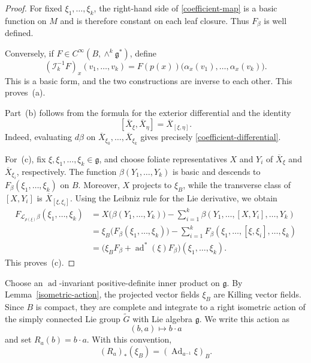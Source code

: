 \documentclass[reqno, 11pt]{amsart}
\theoremstyle{definition}
\theoremstyle{property}
\theoremstyle{remark}
\numberwithin{equation}{section}
\begin{document}
\begin{proof}
For fixed $\xi_1,\dots,\xi_k$, the right-hand side of
\eqref{coefficient-map} is a basic function on $M$ and is therefore
constant on each leaf closure. Thus $F_\beta$ is well defined.

Conversely, if
$F\in C^\infty(B,\wedge^k\mathfrak g^*)$, define
\[
(\mathcal I_k^{-1}F)_x(v_1,\dots,v_k)
=
F(p(x))
\bigl(
\alpha_x(v_1),\dots,\alpha_x(v_k)
\bigr).
\]
This is a basic form, and the two constructions are inverse to each other.
This proves~(a).

Part~(b) follows from the formula for the exterior differential and the
identity
\[
[\overline X_\xi,\overline X_\eta]
=
\overline X_{[\xi,\eta]}.
\]
Indeed, evaluating $d\beta$ on
$\overline X_{\xi_0},\dots,\overline X_{\xi_k}$ gives precisely
\eqref{coefficient-differential}.

For~(c), fix $\xi,\xi_1,\dots,\xi_k\in\mathfrak g$, and choose foliate
representatives $X$ and $Y_i$ of $\overline X_\xi$ and
$\overline X_{\xi_i}$, respectively. The function
$\beta(Y_1,\dots,Y_k)$ is basic and descends to
$F_\beta(\xi_1,\dots,\xi_k)$ on $B$. Moreover, $X$ projects to $\xi_B$,
while the transverse class of $[X,Y_i]$ is
$\overline X_{[\xi,\xi_i]}$. Using the Leibniz rule for the Lie derivative,
we obtain
\begin{align*}
F_{\mathcal L_{\rho(\xi)}\beta}(\xi_1,\dots,\xi_k)
&=
X\bigl(\beta(Y_1,\dots,Y_k)\bigr)
-\sum_{i=1}^k
\beta(Y_1,\dots,[X,Y_i],\dots,Y_k)\\
&=
\xi_B\bigl(F_\beta(\xi_1,\dots,\xi_k)\bigr)
-\sum_{i=1}^k
F_\beta(\xi_1,\dots,[\xi,\xi_i],\dots,\xi_k)\\
&=
\bigl(\xi_BF_\beta+\operatorname{ad}^*(\xi)F_\beta\bigr)
(\xi_1,\dots,\xi_k).
\end{align*}
This proves~(c).
\end{proof}
Choose an $\operatorname{ad}$-invariant positive-definite inner product on
$\mathfrak g$. By Lemma~\ref{isometric-action}, the projected vector fields
$\xi_B$ are Killing vector fields. Since $B$ is compact, they are complete
and integrate to a right isometric action of the simply connected Lie group
$\widetilde G$ with Lie algebra $\mathfrak g$. We write this action as
\[
(b,a)\longmapsto b\cdot a
\]
and set $R_a(b)=b\cdot a$. With this convention,
\begin{equation}\label{projected-transformation}
(R_a)_*(\xi_B)
=
(\operatorname{Ad}_{a^{-1}}\xi)_B.
\end{equation}
\end{document}

